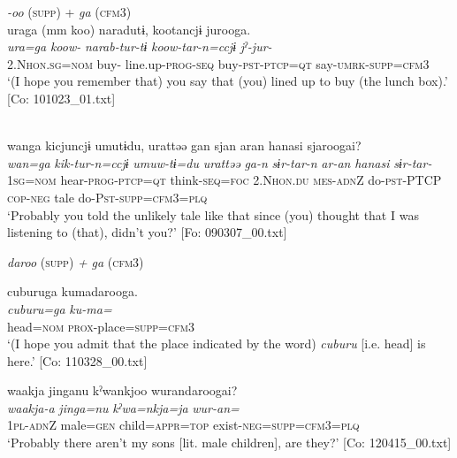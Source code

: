 \ea\label{ex:10.47}   
 \begin{xlist}
 \exi{} \textit{{}-oo} (\textsc{supp}) + \textit{ga} (\textsc{cfm}3)\\
  \ex  %
      \glll    uraga  (mm  koo)  naradutɨ,  kootancjɨ    jurooga.\\
      \textit{ura=ga}    \textit{koow-}  \textit{narab-tur-tɨ}  \textit{koow-tar-n=ccjɨ}  \textit{jˀ-jur-}\\
      2.N\textsc{hon}.\textsc{sg}=\textsc{nom}    buy-  line.up-\textsc{prog}-\textsc{seq}  buy-\textsc{pst}-\textsc{ptcp}=\textsc{qt}  say-\textsc{umrk}-\textsc{supp}=\textsc{cfm}3\\
      \glt       ‘(I hope you remember that) you say that (you) lined up to buy (the lunch box).’ [Co: 101023\_01.txt]

  \ex\relax  [= (8-41)]\\
      \glll    wanga  kicjuncjɨ  umutɨdu,  urattəə   gan  sjan  aran  hanasi  sjaroogai?\\
      \textit{wan=ga}  \textit{kik-tur-n=ccjɨ}  \textit{umuw-tɨ=du}  \textit{urattəə}   \textit{ga-n}  \textit{sɨr-tar-n}  \textit{ar-an}  \textit{hanasi}  \textit{sɨr-tar-}\\
      1\textsc{sg}=\textsc{nom}  hear-\textsc{prog}-\textsc{ptcp}=\textsc{qt}  think-\textsc{seq}=\textsc{foc}  2.N\textsc{hon}.\textsc{du}  \textsc{mes}-\textsc{adn}Z  do-\textsc{pst}-PTCP  \textsc{cop}-\textsc{neg}  tale  do-P\textsc{st}-\textsc{supp}=\textsc{cfm}3=\textsc{plq}\\
      \glt       ‘Probably you told the unlikely tale like that since (you) thought that I was listening to (that), didn’t you?’ [Fo: 090307\_00.txt]

  \exi{} \textit{daroo} (\textsc{supp}) \textit{+} \textit{ga} (\textsc{cfm}3)

  \ex  %
      \glll    cuburuga  kumadarooga.\\
      \textit{cuburu=ga}  \textit{ku-ma=}\\
      head=\textsc{nom}  \textsc{prox}-place=\textsc{supp}=\textsc{cfm}3\\
      \glt       ‘(I hope you admit that the place indicated by the word) \textit{cuburu} [i.e. head] is here.’ [Co: 110328\_00.txt]

  \ex  %
      \glll    waakja  jinganu  kˀwankjoo  wurandaroogai?\\
      \textit{waakja-a}  \textit{jinga=nu}  \textit{kˀwa=nkja=ja}  \textit{wur-an=}\\
      1\textsc{pl}-\textsc{adn}Z  male=\textsc{gen}  child=\textsc{appr}=\textsc{top}  exist-\textsc{neg}=\textsc{supp}=\textsc{cfm}3=\textsc{plq}\\
      \glt       ‘Probably there aren’t my sons [lit. male children], are they?’ [Co: 120415\_00.txt]
    \end{xlist}
\z

